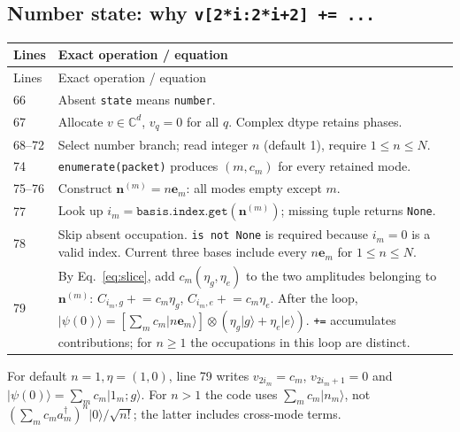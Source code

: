 \documentclass[11pt,a4paper]{article}
\newcommand{\ket}[1]{\lvert #1\rangle}
\newcommand{\code}[1]{\nolinkurl{#1}}
\begin{document}
\subsection{Number state: why \code{v[2*i:2*i+2] += ...}}

\begin{longtable}{p{}p{}}
\toprule Lines & Exact operation / equation\\\midrule\endfirsthead
\toprule Lines & Exact operation / equation\\\midrule\endhead
66 & Absent \code{state} means \code{number}.\\
67 & Allocate $v\in\mathbb C^d$, $v_q=0$ for all $q$. Complex dtype retains phases.\\
68--72 & Select number branch; read integer $n$ (default 1), require $1\leq n\leq N$.\\
74 & \code{enumerate(packet)} produces $(m,c_m)$ for every retained mode.\\
75--76 & Construct $\mathbf n^{(m)}=n\mathbf e_m$: all modes empty except $m$.\\
77 & Look up $i_m=\texttt{basis.index.get}(\mathbf n^{(m)})$; missing tuple returns \code{None}.\\
78 & Skip absent occupation. \code{is not None} is required because $i_m=0$ is a valid index. Current three bases include every $n\mathbf e_m$ for $1\leq n\leq N$.\\
79 & By Eq.~\eqref{eq:slice}, add $c_m(\eta_g,\eta_e)$ to the two amplitudes belonging to $\mathbf n^{(m)}$:
$C_{i_m,g}\mathrel{+}=c_m\eta_g$, $C_{i_m,e}\mathrel{+}=c_m\eta_e$.
After the loop,
$\displaystyle\ket{\psi(0)}
=\left[\sum_m c_m\ket{n\mathbf e_m}\right]\otimes
(\eta_g\ket g+\eta_e\ket e)$.
\code{+=} accumulates contributions; for $n\geq1$ the occupations in this loop are distinct.\\
\bottomrule
\end{longtable}
For default $n=1,\eta=(1,0)$, line 79 writes
$v_{2i_m}=c_m$, $v_{2i_m+1}=0$ and
$\ket{\psi(0)}=\sum_m c_m\ket{1_m;g}$.
For $n>1$ the code uses $\sum_m c_m\ket{n_m}$, not
$(\sum_m c_ma_m^\dagger)^n\ket0/\sqrt{n!}$; the latter includes cross-mode terms.
\end{document}

